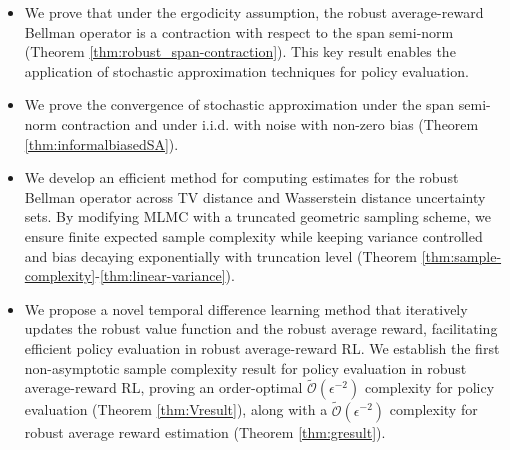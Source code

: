\begin{itemize}[leftmargin=*]
    \item We prove that under the ergodicity assumption, the robust average-reward Bellman operator is a contraction with respect to the span semi-norm (Theorem \ref{thm:robust_span-contraction}). This key result enables the application of stochastic approximation techniques for policy evaluation.
    
    \item We prove the convergence of stochastic approximation under the span semi-norm contraction and under i.i.d. with noise with non-zero bias (Theorem \ref{thm:informalbiasedSA}).
    
    \item We develop an efficient method for computing estimates for the robust Bellman operator across TV distance and Wasserstein distance uncertainty sets. By modifying MLMC with a truncated geometric sampling scheme, we ensure finite expected sample complexity while keeping variance controlled and bias decaying exponentially with truncation level (Theorem \ref{thm:sample-complexity}-\ref{thm:linear-variance}).
    
    \item We propose a novel temporal difference learning method that iteratively updates the robust value function and the robust average reward, facilitating efficient policy evaluation in robust average-reward RL. We establish the first non-asymptotic sample complexity result for policy evaluation in robust average-reward RL, proving an order-optimal $\tilde{\mathcal{O}}(\epsilon^{-2})$ complexity for policy evaluation (Theorem \ref{thm:Vresult}), along with a  $\tilde{\mathcal{O}}(\epsilon^{-2})$ complexity for robust average reward estimation (Theorem \ref{thm:gresult}).
\end{itemize}

